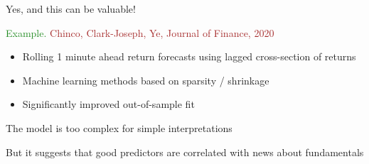 \documentclass[
    xcolor={svgnames,dvipsnames},
    hyperref={colorlinks, citecolor=DeepPink4, linkcolor=DarkRed, urlcolor=DarkBlue}
    ]{beamer}  %
\newcommand{\Eg}{\textcolor{ForestGreen}{Example. }}
\newcommand{\brown}[1]{\textcolor{Brown}{\sf #1}}
\newcommand{\1}{\mathbbm 1}
\begin{document}
\begin{frame}
    
    Yes, and this can be valuable!

            \vspace{0.3em}
    \Eg \brown{Chinco, Clark-Joseph, Ye, Journal of Finance, 2020}

    \begin{itemize}
        \item Rolling 1 minute ahead return forecasts using lagged
            cross-section of returns
            \vspace{0.3em}
        \item Machine learning methods based on sparsity / shrinkage
            \vspace{0.3em}
        \item Significantly improved out-of-sample fit
    \end{itemize}

            \vspace{0.3em}
            \vspace{0.3em}
            \vspace{0.3em}
    The model is too complex for simple interpretations

            \vspace{0.3em}
            \vspace{0.3em}
    But it suggests that good predictors are correlated with news about
    fundamentals

\end{frame}
\end{document}
